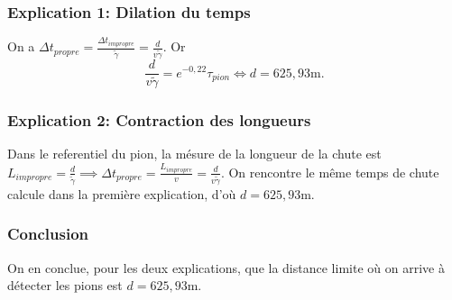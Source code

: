 \documentclass[french]{article}
\begin{document}
	\subsubsection*{Explication 1: Dilation du temps}
	
	On a $ \Delta t_{propre} = \frac{\Delta t_{impropre}}{\tilde{\gamma}} = \frac{d}{v\tilde{\gamma}}$. Or $$ \frac{d}{v\tilde{\gamma}} = e^{-0,22} \tau_{pion} \iff d = 625,93 \mathrm{m}.$$ 
	
	\subsubsection*{Explication 2: Contraction des longueurs}
	
	Dans le referentiel du pion, la mésure de la longueur de la chute est $L_{impropre} = \frac{d}{\tilde{\gamma}} \implies \Delta t_{propre} = \frac{L_{impropre}}{v} = \frac{d}{v\tilde{\gamma}}$. On rencontre le même temps de chute calcule dans la première explication, d'où $d = 625,93 \mathrm{m}$.
	
	\subsubsection*{Conclusion}
	
	On en conclue, pour les deux explications, que la distance limite où on arrive à détecter les pions est $d = 625,93 \mathrm{m}$.
	
	
\end{document}
